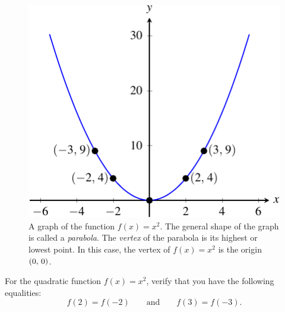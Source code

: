 \documentclass[a4paper,oneside,12pt]{article}
\begin{document}
\begin{figure}[!htbp]
\centering
\includegraphics[scale=1.2]{image/07/a-1.pdf}
\caption{%
  A graph of the function $f(x) = x^2$.  The general shape of the
  graph is called a \emph{parabola}.  The \emph{vertex} of the
  parabola is its highest or lowest point.  In this case, the vertex
  of $f(x) = x^2$ is the origin $\left\lparen{0},\, {0}\right\rparen$.
}
\label{fig:quadratic_a_1}
\end{figure}

\begin{exercise}
For the quadratic function $f(x) = x^2$, verify that you have the
following equalities:
\[
f(2) = f(-2)
\qquad
\text{and}
\qquad
f(3) = f(-3).
\]
\end{exercise}
\end{document}
